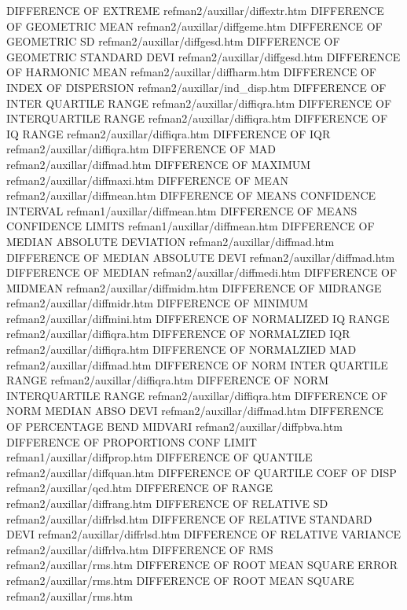 DIFFERENCE OF EXTREME                   refman2/auxillar/diffextr.htm
DIFFERENCE OF GEOMETRIC MEAN            refman2/auxillar/diffgeme.htm
DIFFERENCE OF GEOMETRIC SD              refman2/auxillar/diffgesd.htm
DIFFERENCE OF GEOMETRIC STANDARD DEVI   refman2/auxillar/diffgesd.htm
DIFFERENCE OF HARMONIC MEAN             refman2/auxillar/diffharm.htm
DIFFERENCE OF INDEX OF DISPERSION       refman2/auxillar/ind_disp.htm
DIFFERENCE OF INTER QUARTILE RANGE      refman2/auxillar/diffiqra.htm
DIFFERENCE OF INTERQUARTILE RANGE       refman2/auxillar/diffiqra.htm
DIFFERENCE OF IQ RANGE                  refman2/auxillar/diffiqra.htm
DIFFERENCE OF IQR                       refman2/auxillar/diffiqra.htm
DIFFERENCE OF MAD                       refman2/auxillar/diffmad.htm
DIFFERENCE OF MAXIMUM                   refman2/auxillar/diffmaxi.htm
DIFFERENCE OF MEAN                      refman2/auxillar/diffmean.htm
DIFFERENCE OF MEANS CONFIDENCE INTERVAL refman1/auxillar/diffmean.htm
DIFFERENCE OF MEANS CONFIDENCE LIMITS   refman1/auxillar/diffmean.htm
DIFFERENCE OF MEDIAN ABSOLUTE DEVIATION refman2/auxillar/diffmad.htm
DIFFERENCE OF MEDIAN ABSOLUTE DEVI      refman2/auxillar/diffmad.htm
DIFFERENCE OF MEDIAN                    refman2/auxillar/diffmedi.htm
DIFFERENCE OF MIDMEAN                   refman2/auxillar/diffmidm.htm
DIFFERENCE OF MIDRANGE                  refman2/auxillar/diffmidr.htm
DIFFERENCE OF MINIMUM                   refman2/auxillar/diffmini.htm
DIFFERENCE OF NORMALIZED IQ RANGE       refman2/auxillar/diffiqra.htm
DIFFERENCE OF NORMALZIED IQR            refman2/auxillar/diffiqra.htm
DIFFERENCE OF NORMALZIED MAD            refman2/auxillar/diffmad.htm
DIFFERENCE OF NORM INTER QUARTILE RANGE refman2/auxillar/diffiqra.htm
DIFFERENCE OF NORM INTERQUARTILE RANGE  refman2/auxillar/diffiqra.htm
DIFFERENCE OF NORM MEDIAN ABSO DEVI     refman2/auxillar/diffmad.htm
DIFFERENCE OF PERCENTAGE BEND MIDVARI   refman2/auxillar/diffpbva.htm
DIFFERENCE OF PROPORTIONS CONF LIMIT    refman1/auxillar/diffprop.htm
DIFFERENCE OF QUANTILE                  refman2/auxillar/diffquan.htm
DIFFERENCE OF QUARTILE COEF OF DISP     refman2/auxillar/qcd.htm
DIFFERENCE OF RANGE                     refman2/auxillar/diffrang.htm
DIFFERENCE OF RELATIVE SD               refman2/auxillar/diffrlsd.htm
DIFFERENCE OF RELATIVE STANDARD DEVI    refman2/auxillar/diffrlsd.htm
DIFFERENCE OF RELATIVE VARIANCE         refman2/auxillar/diffrlva.htm
DIFFERENCE OF RMS                       refman2/auxillar/rms.htm
DIFFERENCE OF ROOT MEAN SQUARE ERROR    refman2/auxillar/rms.htm
DIFFERENCE OF ROOT MEAN SQUARE          refman2/auxillar/rms.htm
